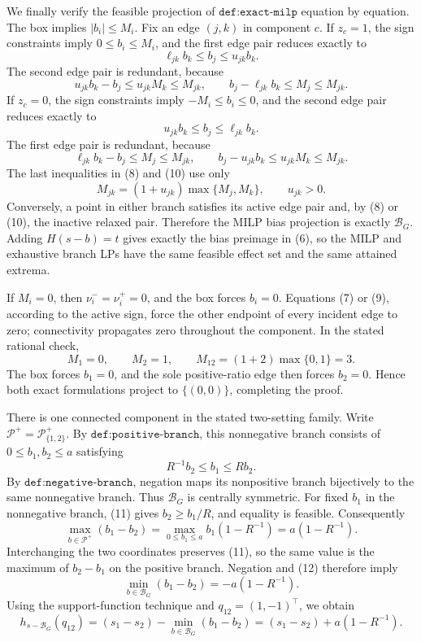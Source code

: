We finally verify the feasible projection of \(\texttt{def:exact-milp}\) equation by equation.  The box implies \(|b_i|\le M_i\).  Fix an edge \((j,k)\) in component \(c\).  If \(z_c=1\), the sign constraints imply \(0\le b_i\le M_i\), and the first edge pair reduces exactly to
\[
 \ell_{jk}b_k\le b_j\le u_{jk}b_k.
\tag{7}
\]
The second edge pair is redundant, because
\[
 u_{jk}b_k-b_j\le u_{jk}M_k\le M_{jk},
 \qquad
 b_j-\ell_{jk}b_k\le M_j\le M_{jk}.
\tag{8}
\]
If \(z_c=0\), the sign constraints imply \(-M_i\le b_i\le0\), and the second edge pair reduces exactly to
\[
 u_{jk}b_k\le b_j\le\ell_{jk}b_k.
\tag{9}
\]
The first edge pair is redundant, because
\[
 \ell_{jk}b_k-b_j\le M_j\le M_{jk},
 \qquad
 b_j-u_{jk}b_k\le u_{jk}M_k\le M_{jk}.
\tag{10}
\]
The last inequalities in (8) and (10) use only
\[
 M_{jk}=(1+u_{jk})\max\{M_j,M_k\},
 \qquad u_{jk}>0.
\]
Conversely, a point in either branch satisfies its active edge pair and, by (8) or (10), the inactive relaxed pair.  Therefore the MILP bias projection is exactly \(\mathcal B_G\).  Adding \(H(s-b)=t\) gives exactly the bias preimage in (6), so the MILP and exhaustive branch LPs have the same feasible effect set and the same attained extrema.

If \(M_i=0\), then \(\nu_i^- =\nu_i^+=0\), and the box forces \(b_i=0\).  Equations (7) or (9), according to the active sign, force the other endpoint of every incident edge to zero; connectivity propagates zero throughout the component.  In the stated rational check,
\[
 M_1=0,
 \qquad M_2=1,
 \qquad M_{12}=(1+2)\max\{0,1\}=3.
\]
The box forces \(b_1=0\), and the sole positive-ratio edge then forces \(b_2=0\).  Hence both exact formulations project to \(\{(0,0)\}\), completing the proof.

There is one connected component in the stated two-setting family.  Write \(\mathcal P^+=\mathcal P_{\{1,2\}}^+\).  By \(\texttt{def:positive-branch}\), this nonnegative branch consists of \(0\le b_1,b_2\le a\) satisfying
\[
 R^{-1}b_2\le b_1\le Rb_2.
\tag{11}
\]
By \(\texttt{def:negative-branch}\), negation maps its nonpositive branch bijectively to the same nonnegative branch.  Thus \(\mathcal B_G\) is centrally symmetric.  For fixed \(b_1\) in the nonnegative branch, (11) gives \(b_2\ge b_1/R\), and equality is feasible.  Consequently
\[
 \max_{b\in\mathcal P^+}(b_1-b_2)
 =\max_{0\le b_1\le a}b_1(1-R^{-1})
 =a(1-R^{-1}).
\tag{12}
\]
Interchanging the two coordinates preserves (11), so the same value is the maximum of \(b_2-b_1\) on the positive branch.  Negation and (12) therefore imply
\[
 \min_{b\in\mathcal B_G}(b_1-b_2)=-a(1-R^{-1}).
\]
Using the support-function technique and \(q_{12}=(1,-1)^{\top}\), we obtain
\[
 h_{s-\mathcal B_G}(q_{12})
 =(s_1-s_2)-\min_{b\in\mathcal B_G}(b_1-b_2)
 =(s_1-s_2)+a(1-R^{-1}).
\tag{13}
\]

